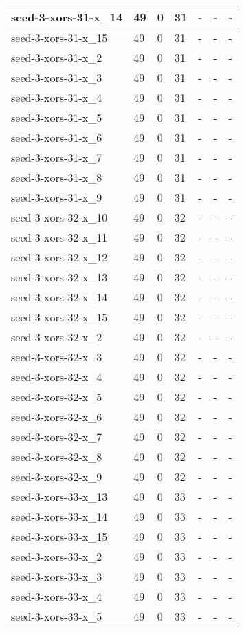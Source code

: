 \begin{scriptsize}
\begin{longtable}{|p{5cm}|l|l|l|l|l|l|}
seed-3-xors-31-x\_14&49&0&31&-&-&- \\ \hline 
seed-3-xors-31-x\_15&49&0&31&-&-&- \\ \hline 
seed-3-xors-31-x\_2&49&0&31&-&-&- \\ \hline 
seed-3-xors-31-x\_3&49&0&31&-&-&- \\ \hline 
seed-3-xors-31-x\_4&49&0&31&-&-&- \\ \hline 
seed-3-xors-31-x\_5&49&0&31&-&-&- \\ \hline 
seed-3-xors-31-x\_6&49&0&31&-&-&- \\ \hline 
seed-3-xors-31-x\_7&49&0&31&-&-&- \\ \hline 
seed-3-xors-31-x\_8&49&0&31&-&-&- \\ \hline 
seed-3-xors-31-x\_9&49&0&31&-&-&- \\ \hline 
seed-3-xors-32-x\_10&49&0&32&-&-&- \\ \hline 
seed-3-xors-32-x\_11&49&0&32&-&-&- \\ \hline 
seed-3-xors-32-x\_12&49&0&32&-&-&- \\ \hline 
seed-3-xors-32-x\_13&49&0&32&-&-&- \\ \hline 
seed-3-xors-32-x\_14&49&0&32&-&-&- \\ \hline 
seed-3-xors-32-x\_15&49&0&32&-&-&- \\ \hline 
seed-3-xors-32-x\_2&49&0&32&-&-&- \\ \hline 
seed-3-xors-32-x\_3&49&0&32&-&-&- \\ \hline 
seed-3-xors-32-x\_4&49&0&32&-&-&- \\ \hline 
seed-3-xors-32-x\_5&49&0&32&-&-&- \\ \hline 
seed-3-xors-32-x\_6&49&0&32&-&-&- \\ \hline 
seed-3-xors-32-x\_7&49&0&32&-&-&- \\ \hline 
seed-3-xors-32-x\_8&49&0&32&-&-&- \\ \hline 
seed-3-xors-32-x\_9&49&0&32&-&-&- \\ \hline 
seed-3-xors-33-x\_13&49&0&33&-&-&- \\ \hline 
seed-3-xors-33-x\_14&49&0&33&-&-&- \\ \hline 
seed-3-xors-33-x\_15&49&0&33&-&-&- \\ \hline 
seed-3-xors-33-x\_2&49&0&33&-&-&- \\ \hline 
seed-3-xors-33-x\_3&49&0&33&-&-&- \\ \hline 
seed-3-xors-33-x\_4&49&0&33&-&-&- \\ \hline 
seed-3-xors-33-x\_5&49&0&33&-&-&- \\ \hline 

\end{longtable}
\end{scriptsize}

